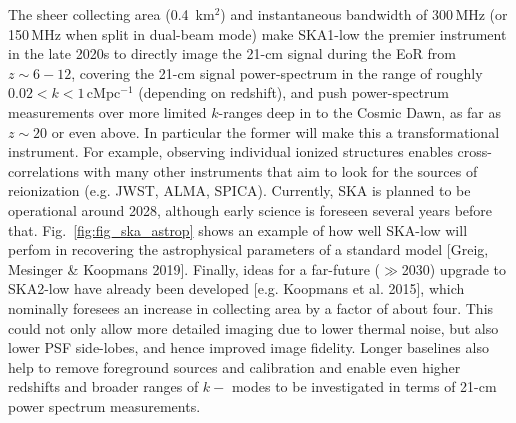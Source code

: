 %
The sheer collecting area (0.4 \,km$^2$) and instantaneous bandwidth of 300\,MHz (or 150\,MHz when split in dual-beam mode) make SKA1-low the premier instrument in the late 2020s to directly image the 21-cm signal during the EoR from $z\sim 6-12$, covering the 21-cm signal power-spectrum in the range of roughly $ 0.02 < k < 1 $\,cMpc$^{-1}$ (depending on redshift), and push power-spectrum measurements over more limited $k$-ranges deep in to the Cosmic Dawn, as far as $z\sim 20$ or even above. In particular the former will make this a transformational instrument. For example, observing individual ionized structures enables cross-correlations with many other instruments that aim to look for the sources of reionization (e.g. JWST, ALMA, SPICA). Currently, SKA is planned to be operational around 2028, although early science is foreseen several years before that. Fig.~\ref{fig:fig_ska_astrop} shows an example of how well SKA-low will perfom in recovering the astrophysical parameters of a standard model [Greig, Mesinger \& Koopmans 2019].
%
Finally, ideas for a far-future ($\gg$2030) upgrade to SKA2-low have already been developed [e.g. Koopmans et al. 2015], which nominally foresees an increase in collecting area by a factor of about four. This could not only allow more detailed imaging due to lower thermal noise, but also lower PSF side-lobes, and hence improved image fidelity. Longer baselines also help to remove foreground sources and calibration and enable even higher redshifts and broader ranges of $k-$ modes to be investigated in terms of 21-cm power spectrum measurements.




